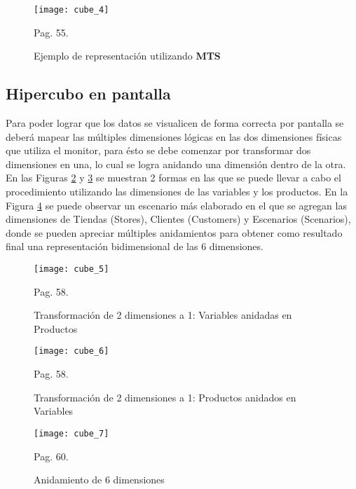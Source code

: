 \documentclass[a4paper,11pt]{article}
\begin{document}
    \begin{figure}
      \begin{center}
        \texttt{[image: cube\_4]}
        \caption{Ejemplo de representación utilizando \textbf{MTS}} \cite{olap_solutions} Pag. 55.
        \label{cube_4}
      \end{center}
    \end{figure}
    
    
    \subsection{Hipercubo en pantalla}
    
    Para poder lograr que los datos se visualicen de forma correcta por pantalla se deberá mapear las múltiples dimensiones lógicas en las dos dimensiones físicas
    que utiliza el monitor, para ésto se debe comenzar por transformar dos dimensiones en una, lo cual se logra anidando una dimensión dentro de la otra. En las
    Figuras \ref{cube_5} y \ref{cube_6} se muestran 2 formas en las que se puede llevar a cabo el procedimiento utilizando las dimensiones de las variables y los
    productos. En la Figura \ref{cube_7} se puede observar un escenario más elaborado en el que se agregan las dimensiones de Tiendas (Stores), Clientes
    (Customers) y Escenarios (Scenarios), donde se pueden apreciar múltiples anidamientos para obtener como resultado final una representación bidimensional de
    las 6 dimensiones.
    
    \begin{figure}
      \begin{center}
        \texttt{[image: cube\_5]}
        \caption{Transformación de 2 dimensiones a 1: Variables anidadas en Productos} \cite{olap_solutions} Pag. 58.
        \label{cube_5}
      \end{center}
    \end{figure}
    
    \begin{figure}
      \begin{center}
        \texttt{[image: cube\_6]}
        \caption{Transformación de 2 dimensiones a 1: Productos anidados en Variables} \cite{olap_solutions} Pag. 58.
        \label{cube_6}
      \end{center}
    \end{figure}
    
    \begin{figure}
      \begin{center}
        \texttt{[image: cube\_7]}
        \caption{Anidamiento de 6 dimensiones} \cite{olap_solutions} Pag. 60.
        \label{cube_7}
      \end{center}
    \end{figure}
    
\end{document}
